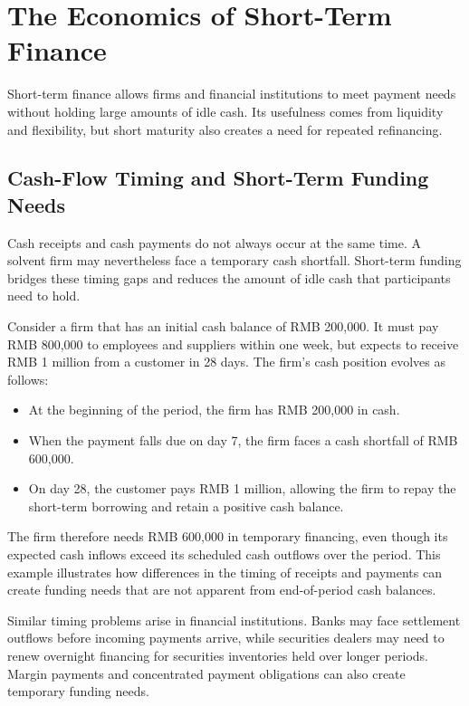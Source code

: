 \section{The Economics of Short-Term Finance}

Short-term finance allows firms and financial institutions to meet payment needs without holding large amounts of idle cash. Its usefulness comes from liquidity and flexibility, but short maturity also creates a need for repeated refinancing.

\subsection{Cash-Flow Timing and Short-Term Funding Needs}

Cash receipts and cash payments do not always occur at
the same time. A solvent firm may nevertheless face a
temporary cash shortfall. Short-term funding bridges
these timing gaps and reduces the amount of idle cash
that participants need to hold.

Consider a firm that has an initial cash balance of
RMB 200,000. It must pay RMB 800,000 to employees and
suppliers within one week, but expects to receive
RMB 1 million from a customer in 28 days. The firm's
cash position evolves as follows:

\begin{itemize}
\item At the beginning of the period, the firm has
RMB 200,000 in cash.

\item When the payment falls due on day 7, the firm
faces a cash shortfall of RMB 600,000.

\item On day 28, the customer pays RMB 1 million,
allowing the firm to repay the short-term borrowing
and retain a positive cash balance.
\end{itemize}

The firm therefore needs RMB 600,000 in temporary
financing, even though its expected cash inflows exceed
its scheduled cash outflows over the period. This example
illustrates how differences in the timing of receipts
and payments can create funding needs that are not
apparent from end-of-period cash balances.

Similar timing problems arise in financial institutions.
Banks may face settlement outflows before incoming
payments arrive, while securities dealers may need to
renew overnight financing for securities inventories
held over longer periods. Margin payments and
concentrated payment obligations can also create
temporary funding needs.

